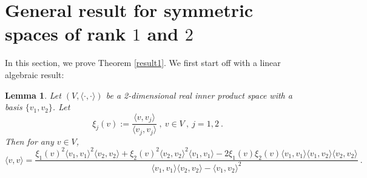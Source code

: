 \documentclass[12pt]{amsart}
\newtheorem{lemma}[theorem]{Lemma}
\theoremstyle{definition}
\numberwithin{equation}{section}
\begin{document}
\section{General result for symmetric spaces of rank $1$ and $2$}
In this section, we prove Theorem \ref{result1}. We first start off with a linear algebraic result:
\begin{lemma} \label{linear_algebra_lemma}
Let $\left(V,\langle \cdot,\cdot \rangle\right)$ be a 2-dimensional real inner product space with a basis $\{v_1,v_2\}$. Let 
\begin{equation*}
\xi_j(v):= \frac{\langle v,v_j \rangle}{\langle v_j,v_j \rangle}\:,\: v \in V\:,\:j=1,2\:.
\end{equation*}
Then for any $v \in V$,
\begin{equation*}
\langle v,v \rangle = \frac{\xi_1(v)^2 \langle v_1,v_1 \rangle^2 \langle v_2,v_2 \rangle + \xi_2(v)^2 \langle v_2,v_2 \rangle^2 \langle v_1,v_1 \rangle - 2\xi_1(v) \xi_2(v) \langle v_1,v_1 \rangle \langle v_1,v_2 \rangle \langle v_2,v_2 \rangle }{\langle v_1,v_1 \rangle \langle v_2,v_2 \rangle - \langle v_1,v_2 \rangle^2}\:.
\end{equation*}
\end{lemma}
\end{document}
